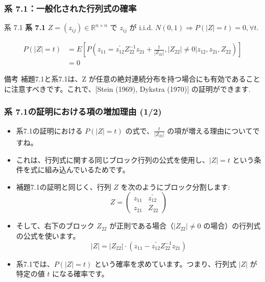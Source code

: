\documentclass{beamer}
\begin{document}
\begin{frame}
\frametitle{系 7.1：一般化された行列式の確率}
\begin{block}{系 7.1}
\textbf{系 7.1} $Z=(z_{ij})\in\mathbb{R}^{n\times n}$ で $z_{ij}$ が i.i.d. $N(0,1)\Rightarrow P(|Z|=t)=0, \forall t$.
\end{block}

\begin{align*} 
P(|Z|=t) &= E[P(z_{11}=z_{12}^{\prime}Z_{22}^{-1}z_{21}+\frac{t}{|Z_{22}|},|Z_{22}|\ne0|z_{12},z_{21},Z_{22})] \\ 
&= 0
\end{align*}


\begin{alertblock}{備考}
補題7.1と系7.1は、Z が任意の絶対連続分布を持つ場合にも有効であることに注意すべきです。これで、[Stein (1969), Dykstra (1970)] の証明ができます.
\end{alertblock}
\end{frame}


\begin{frame}
\frametitle{系 7.1の証明における項の増加理由 (1/2)}
\begin{itemize}
    \item 系7.1の証明における $P(|Z|=t)$ の式で、$\frac{t}{|Z_{22}|}$ の項が増える理由についてですね。
    \item これは、行列式に関する同じブロック行列の公式を使用し、$|Z|=t$ という条件を式に組み込んでいるためです。
    \item 補題7.1の証明と同じく、行列 $Z$ を次のようにブロック分割します:
    \[ Z=\begin{pmatrix}z_{11}&z_{12}^{\prime}\\ z_{21}&Z_{22}\end{pmatrix} \]
    \item そして、右下のブロック $Z_{22}$ が正則である場合（$|Z_{22}|\ne0$ の場合）の行列式の公式を使います。
    \[ |Z|=|Z_{22}|\cdot(z_{11}-z_{12}^{\prime}Z_{22}^{-1}z_{21}) \]
    \item 系7.1では、$P(|Z|=t)$ という確率を求めています。つまり、行列式 $|Z|$ が特定の値 $t$ になる確率です。
\end{itemize}
\end{frame}
\end{document}
